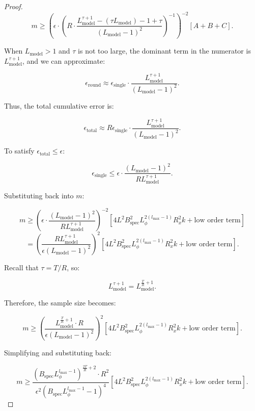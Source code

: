 \begin{proof}
\[
m \geq \left( \epsilon \cdot \left( R \cdot \frac{L_{\text{model}}^{\tau+1} - (\tau L_{\text{model}}) - 1 + \tau}{(L_{\text{model}} - 1)^2} \right)^{-1} \right)^{-2} \left[ A + B + C \right].
\]

When \( L_{\text{model}} > 1 \) and \( \tau \) is not too large, the dominant term in the numerator is \( L_{\text{model}}^{\tau+1} \), and we can approximate:

\[
\epsilon_{\text{round}} \approx \epsilon_{\text{single}} \cdot \frac{L_{\text{model}}^{\tau+1}}{(L_{\text{model}} - 1)^2}.
\]

Thus, the total cumulative error is:

\[
\epsilon_{\text{total}} \approx R \epsilon_{\text{single}} \cdot \frac{L_{\text{model}}^{\tau+1}}{(L_{\text{model}} - 1)^2}.
\]


To satisfy \( \epsilon_{\text{total}} \leq \epsilon \):

\[
\epsilon_{\text{single}} \leq \epsilon \cdot \frac{(L_{\text{model}} - 1)^2}{R L_{\text{model}}^{\tau+1}}.
\]


Substituting back into \( m \):

\[
m \geq \left( \epsilon \cdot \frac{(L_{\text{model}} - 1)^2}{R L_{\text{model}}^{\tau+1}} \right)^{-2} \left[ 4 L^2 B_{\text{spec}}^2 L_{\phi}^{2(l_{\text{max}}-1)} R_x^2 k + \text{low order term} \right] \] \[ = \left( \frac{R L_{\text{model}}^{\tau+1}}{\epsilon (L_{\text{model}} - 1)^2} \right)^{2} \left[ 4 L^2 B_{\text{spec}}^2 L_{\phi}^{2(l_{\text{max}}-1)} R_x^2 k + \text{low order term} \right].
\]


Recall that \( \tau = T / R \), so:

\[
L_{\text{model}}^{\tau+1} = L_{\text{model}}^{\frac{T}{R} + 1}.
\]

Therefore, the sample size becomes:

\[
m \geq \left( \frac{L_{\text{model}}^{\frac{T}{R}+1} \cdot R}{\epsilon (L_{\text{model}} - 1)^2} \right)^{2} \left[ 4 L^2 B_{\text{spec}}^2 L_{\phi}^{2(l_{\text{max}}-1)} R_x^2 k + \text{low order term} \right].
\]

Simplifying and substituting back:



  \[
m \geq  \frac{\left(B_{\text{spec}} L_{\phi}^{l_{\text{max}}-1}\right)^{\frac{2T}{R}+2} \cdot R^2 }{\epsilon^2 (B_{\text{spec}} L_{\phi}^{l_{\text{max}}-1} - 1)^4}  \left[ 4 L^2 B_{\text{spec}}^2 L_{\phi}^{2(l_{\text{max}}-1)} R_x^2 k + \text{low order term} \right].
\]

\end{proof}
